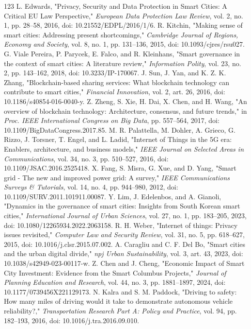 \documentclass[journal]{IEEEtran}
\begin{document}
\begin{thebibliography}{123}
 L. Edwards, "Privacy, Security and Data Protection in Smart Cities: A Critical EU Law Perspective," \emph{European Data Protection Law Review}, vol. 2, no. 1, pp. 28--58, 2016, doi: 10.21552/EDPL/2016/1/6.
 R. Kitchin, "Making sense of smart cities: Addressing present shortcomings," \emph{Cambridge Journal of Regions, Economy and Society}, vol. 8, no. 1, pp. 131--136, 2015, doi: 10.1093/cjres/rsu027.
 G. Viale Pereira, P. Parycek, E. Falco, and R. Kleinhans, "Smart governance in the context of smart cities: A literature review," \emph{Information Polity}, vol. 23, no. 2, pp. 143--162, 2018, doi: 10.3233/IP-170067.
 J. Sun, J. Yan, and K. Z. K. Zhang, "Blockchain-based sharing services: What blockchain technology can contribute to smart cities," \emph{Financial Innovation}, vol. 2, art. 26, 2016, doi: 10.1186/s40854-016-0040-y.
 Z. Zheng, S. Xie, H. Dai, X. Chen, and H. Wang, "An overview of blockchain technology: Architecture, consensus, and future trends," in \emph{Proc. IEEE International Congress on Big Data}, pp. 557--564, 2017, doi: 10.1109/BigDataCongress.2017.85.
 M. R. Palattella, M. Dohler, A. Grieco, G. Rizzo, J. Torsner, T. Engel, and L. Ladid, "Internet of Things in the 5G era: Enablers, architecture, and business models," \emph{IEEE Journal on Selected Areas in Communications}, vol. 34, no. 3, pp. 510--527, 2016, doi: 10.1109/JSAC.2016.2525418.
 X. Fang, S. Misra, G. Xue, and D. Yang, "Smart grid - The new and improved power grid: A survey," \emph{IEEE Communications Surveys \& Tutorials}, vol. 14, no. 4, pp. 944--980, 2012, doi: 10.1109/SURV.2011.101911.00087.
 Y. Lim, J. Edelenbos, and A. Gianoli, "Dynamics in the governance of smart cities: Insights from South Korean smart cities," \emph{International Journal of Urban Sciences}, vol. 27, no. 1, pp. 183--205, 2023, doi: 10.1080/12265934.2022.2063158.
 R. H. Weber, "Internet of things: Privacy issues revisited," \emph{Computer Law and Security Review}, vol. 31, no. 5, pp. 618--627, 2015, doi: 10.1016/j.clsr.2015.07.002.
 A. Caragliu and C. F. Del Bo, "Smart cities and the urban digital divide," \emph{npj Urban Sustainability}, vol. 3, art. 43, 2023, doi: 10.1038/s42949-023-00117-w.
 Z. Chen and J. Cheng, "Economic Impact of Smart City Investment: Evidence from the Smart Columbus Projects," \emph{Journal of Planning Education and Research}, vol. 44, no. 3, pp. 1881--1897, 2024, doi: 10.1177/0739456X221129173.
 N. Kalra and S. M. Paddock, "Driving to safety: How many miles of driving would it take to demonstrate autonomous vehicle reliability?," \emph{Transportation Research Part A: Policy and Practice}, vol. 94, pp. 182--193, 2016, doi: 10.1016/j.tra.2016.09.010.

\end{thebibliography}
\end{document}
